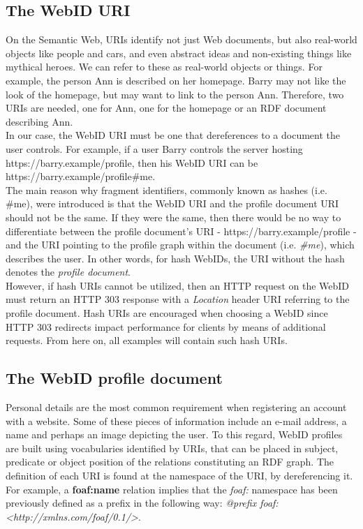\subsection{The WebID URI}
\label{subsec:webid_uri}
On the Semantic Web, URIs identify not just Web documents, but also real-world objects like people and cars, and even abstract ideas and non-existing things like mythical heroes. We can refer to these as real-world objects or things. For example, the person Ann is described on her homepage. Barry may not like the look of the homepage, but may want to link to the person Ann. Therefore, two URIs are needed, one for Ann, one for the homepage or an RDF document describing Ann.\\

In our case, the WebID URI must be one that dereferences to a document the user controls. For example, if a user Barry controls the server hosting https://barry.example/profile, then his WebID URI can be https://barry.example/profile\#me.\\

The main reason why fragment identifiers, commonly known as hashes (i.e. \#me), were introduced is that the WebID URI and the profile document URI should not be the same. If they were the same, then there would be no way to differentiate between the profile document's URI - https://barry.example/profile - and the URI pointing to the profile graph within the document (i.e. \textit{\#me}), which describes the user. In other words, for hash WebIDs, the URI without the hash denotes the \textit{profile document}.\\

However, if hash URIs cannot be utilized, then an HTTP request on the WebID must return an HTTP 303 response with a \textit{Location} header URI referring to the profile document. Hash URIs are encouraged when choosing a WebID since HTTP 303 redirects impact performance for clients by means of additional requests. From here on, all examples will contain such hash URIs.


\subsection{The WebID profile document}
\label{subsec:webid_profile}
Personal details are the most common requirement when registering an account with a website. Some of these pieces of information include an e-mail address, a name and perhaps an image depicting the user. To this regard, WebID profiles are built using vocabularies identified by URIs, that can be placed in subject, predicate or object position of the relations constituting an RDF graph. The definition of each URI is found at the namespace of the URI, by dereferencing it. For example, a \textbf{foaf:name} relation implies that the \textit{foaf:} namespace has been previously defined as a prefix in the following way: \textit{@prefix foaf: <http://xmlns.com/foaf/0.1/>}.\\

